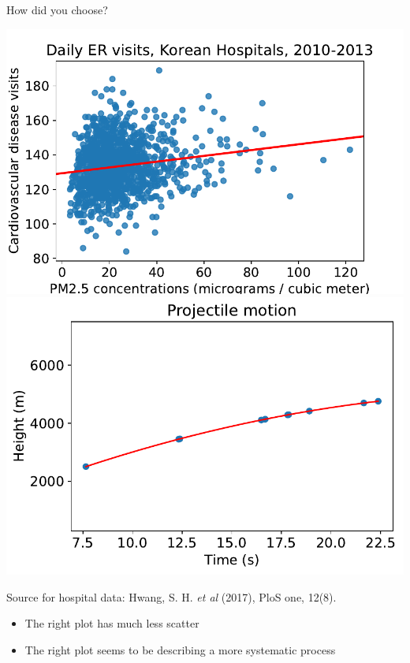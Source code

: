 \documentclass[aspectratio=169, handout]{beamer}
\begin{document}
\begin{frame}{How did you choose?}

\includegraphics[scale=0.475]{data/Huang_et_al/huang_pm25vcirc_regplot.pdf}\includegraphics[scale=0.475]{data/Huang_et_al/projectile.pdf}

\begin{tiny}
Source for hospital data: Hwang, S. H. \textit{et al} (2017), PloS one, 12(8).
\end{tiny}

\pause

\begin{itemize}
\item The right plot has much less scatter
\item The right plot seems to be describing a more systematic process
\end{itemize}


\end{frame}
\end{document}
